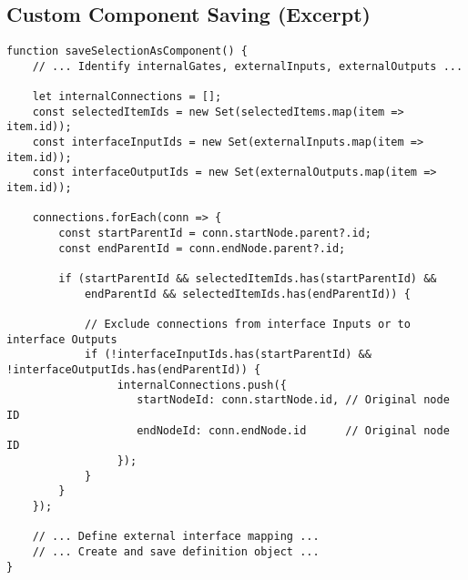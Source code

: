 \documentclass[11pt, a4paper]{article}
\begin{document}
\subsection{Custom Component Saving (Excerpt)}
\begin{lstlisting}[caption={Identifying internal connections during custom component saving}, label={lst:save_internal_conn}]
function saveSelectionAsComponent() {
    // ... Identify internalGates, externalInputs, externalOutputs ...
    
    let internalConnections = [];
    const selectedItemIds = new Set(selectedItems.map(item => item.id));
    const interfaceInputIds = new Set(externalInputs.map(item => item.id));
    const interfaceOutputIds = new Set(externalOutputs.map(item => item.id));

    connections.forEach(conn => { 
        const startParentId = conn.startNode.parent?.id;
        const endParentId = conn.endNode.parent?.id;

        if (startParentId && selectedItemIds.has(startParentId) &&
            endParentId && selectedItemIds.has(endParentId)) {

            // Exclude connections from interface Inputs or to interface Outputs
            if (!interfaceInputIds.has(startParentId) && !interfaceOutputIds.has(endParentId)) {
                 internalConnections.push({
                    startNodeId: conn.startNode.id, // Original node ID
                    endNodeId: conn.endNode.id      // Original node ID
                 });
            }
        }
    });
    
    // ... Define external interface mapping ...
    // ... Create and save definition object ...
}
\end{lstlisting}


\end{document}
